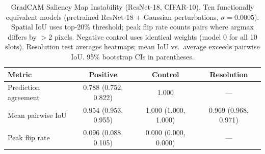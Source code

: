 \begin{table}[ht]
\centering
\caption{GradCAM Saliency Map Instability (ResNet-18, CIFAR-10).
  Ten functionally equivalent models (pretrained ResNet-18 + Gaussian perturbations, $\sigma=0.0005$).
  Spatial IoU uses top-20\% threshold; peak flip rate counts pairs where argmax differs by $>$2 pixels.
  Negative control uses identical weights (model 0 for all 10 slots).
  Resolution test averages heatmaps; mean IoU vs.\ average exceeds pairwise IoU.
  95\% bootstrap CIs in parentheses.}
\label{tab:gradcam}
\begin{tabular}{lccc}
\toprule
Metric & Positive & Control & Resolution \\
\midrule
Prediction agreement & 0.788 (0.752, 0.822) & 1.000 & --- \\
Mean pairwise IoU & 0.954 (0.953, 0.955) & 1.000 (1.000, 1.000) & 0.969 (0.968, 0.971) \\
Peak flip rate & 0.096 (0.088, 0.105) & 0.000 (0.000, 0.000) & --- \\
\bottomrule
\end{tabular}
\end{table}
